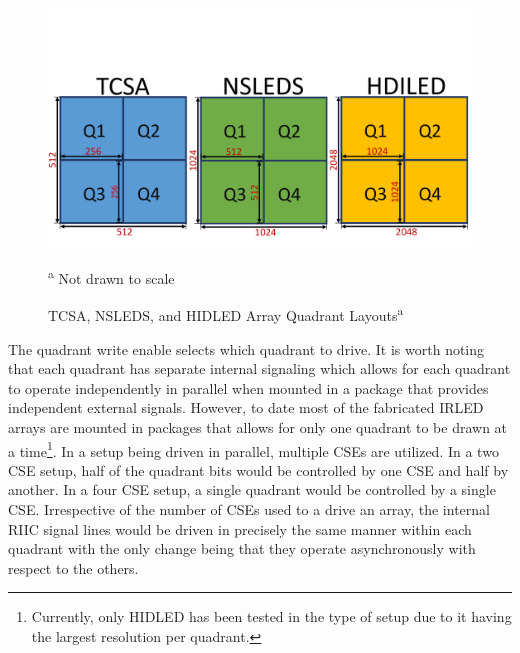     \begin{figure}
        \centering
        \includegraphics[trim=0in 0.35in 0in 1.5in,width=1.0\textwidth]{fig/tcsa_nsleds_hdiled_quads.pdf}
        \caption[TCSA, NSLEDS, and HIDLED Array Quadrant Layouts]{TCSA, NSLEDS, and HIDLED Array Quadrant Layouts\textsuperscript{a}}
        \vspace{-8px}
        \footnotesize\textsuperscript{a} Not drawn to scale
        \label{fig:tcsa_nsleds_hdiled_quads}
    \end{figure}

    The quadrant write enable selects which quadrant to drive. It is worth noting that each quadrant has separate internal signaling which allows for each quadrant to operate independently in parallel when mounted in a package that provides independent external signals. However, to date most of the fabricated IRLED arrays are mounted in packages that allows for only one quadrant to be drawn at a time\footnote{Currently, only HIDLED has been tested in the type of setup\cite{lassiter1, LassiterEtAl2019_1, LassiterEtAl2019_2, lassiter3} due to it having the largest resolution per quadrant.}. In a setup being driven in parallel, multiple CSEs are utilized. In a two CSE setup, half of the quadrant bits would be controlled by one CSE and half by another. In a four CSE setup, a single quadrant would be controlled by a single CSE. Irrespective of the number of CSEs used to a drive an array, the internal RIIC signal lines would be driven in precisely the same manner within each quadrant with the only change being that they operate asynchronously with respect to the others.

